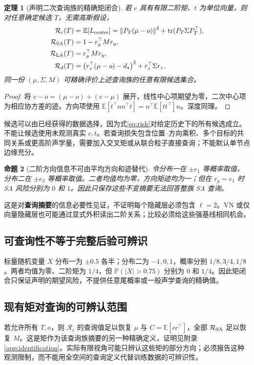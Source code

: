 \documentclass[UTF8,fontset=fandol,11pt,a4paper]{ctexart}
\theoremstyle{plain}
\newtheorem{theorem}{定理}[section]
\newtheorem{proposition}[theorem]{命题}
\theoremstyle{definition}
\theoremstyle{remark}
\numberwithin{equation}{section}
\newcommand{\E}{\mathbb E}
\newcommand{\Prb}{\mathbb P}
\newcommand{\cR}{\mathcal R}
\newcommand{\norm}[1]{\left\lVert#1\right\rVert}
\DeclareMathOperator{\tr}{tr}
\begin{document}
\begin{theorem}[声明二次查询族的精确矩闭合]
\label{thm:moments}
若 $c$ 具有有限二阶矩、$t$ 为单位向量，则对任意确定候选 $T$，无需高斯假设，
\begin{align}
 \cR_c(T)&=\E[L_{\rm center}]
 =\norm{P_T(\mu-o)}^2+\tr(P_T\Sigma P_T^\top),\\
 \cR_{\rm SA}(T)&=1-r_y^\top Mr_y,\\
 \cR_{\rm LA}(T)&=r_y^\top Mr_y,\\
 \cR_d(T)&=\big(r_z^\top(\mu-o)-d_\star\big)^2+r_z^\top\Sigma r_z.
 \label{eq:risk}
\end{align}
同一份 $(\mu,\Sigma,M)$ 可精确评价上述查询族的任意有限候选集合。
\end{theorem}
\begin{proof}
将 $c-o=(\mu-o)+(c-\mu)$ 展开，线性中心项期望为零，二次中心项为相应协方差的迹。方向项使用 $\E[t^\top nn^\top t]=n^\top\E[tt^\top]n$。深度同理。
\end{proof}

候选可以由已经获得的数据选择，因为式\eqref{eq:risk}对给定历史下的所有候选成立。不能让候选使用未观测真实 $c,t$。若查询损失包含位置--方向乘积、多个目标的共同关系或更高阶声学量，需要加入交叉矩或从联合粒子直接查询；不能默认单节点边缘充分。

\begin{proposition}[二阶方向信息不可由平均方向和迹替代]
令分布一在 $\pm e_1$ 等概率取值，分布二在 $\pm e_2$ 等概率取值。二者均值均为零，方向矩迹均为一；但在 $r_y=e_1$ 时 SA 风险分别为 $0$ 和 $1$。因此只保存这些不变摘要无法回答整族 SA 查询。
\end{proposition}
这是对\textbf{查询摘要}的信息必要性见证，不证明每个隐藏层必须包含 $\ell=2$。VN 或仅向量隐藏层也可能通过显式外积读出二阶关系；比较必须给这些强基线相同机会。

\subsection{可查询性不等于完整后验可辨识}
标量随机变量 $X$ 分布一为 $\pm0.5$ 各半；分布二为 $-1,0,1$，概率分别 $1/8,3/4,1/8$。两者均值为零、二阶矩为 $1/4$，但 $\Prb(|X|>0.75)$ 分别为 $0$ 和 $1/4$。因此矩闭合只保证声明的期望风险，不提供任意尾概率或一般声学查询的精确值。

\subsection{现有矩对查询的可辨认范围}
若允许所有 $T,o$，则 $\cR_c$ 的查询值足以恢复 $\mu$ 与 $C=\E[cc^\top]$，全部 $\cR_{\rm SA}$ 足以恢复 $M$。这是矩作为该查询族摘要的另一种精确定义，证明见附录\ref{app:identification}。实际有限视角可能只辨认这些矩的部分方向；必须报告这种观测限制，而不能用全空间的查询定义代替训练数据的可辨识性。
\end{document}
